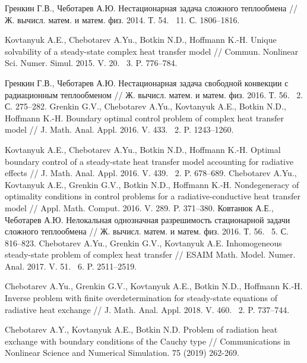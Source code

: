 \documentclass[12pt]{article}
\begin{document}
\begin{thebibliography}{999}
        Гренкин Г.В., Чеботарев А.Ю. Нестационарная задача сложного теплообмена // Ж. вычисл. матем. и матем. физ. 2014. Т. 54. \textnumero~11. С. 1806--1816.

        Kovtanyuk A.E., Chebotarev A.Yu., Botkin N.D., Hoffmann K.-H. Unique solvability of a steady-state complex heat transfer model // Commun. Nonlinear Sci. Numer. Simul. 2015. V. 20. \textnumero~3. P. 776--784.

        Гренкин Г.В., Чеботарев А.Ю. Нестационарная задача свободной конвекции с радиационным теплообменом // Ж. вычисл. матем. и матем. физ. 2016. Т. 56. \textnumero~2. С. 275--282.
        Grenkin G.V., Chebotarev A.Yu., Kovtanyuk A.E., Botkin N.D., Hoffmann K.-H. Boundary optimal control problem of complex heat transfer model // J. Math. Anal. Appl. 2016. V. 433. \textnumero~2. P. 1243--1260.

        Kovtanyuk A.E., Chebotarev A.Yu., Botkin N.D., Hoffmann K.-H. Optimal boundary control of a steady-state heat transfer model accounting for radiative effects // J. Math. Anal. Appl. 2016. V. 439. \textnumero~2. P. 678--689.
        Chebotarev A.Yu., Kovtanyuk A.E., Grenkin G.V., Botkin N.D., Hoffmann K.-H.
        Nondegeneracy of optimality conditions in control problems for a radiative-conductive heat transfer model // Appl. Math. Comput. 2016. V. 289. P. 371--380.
        Ковтанюк А.Е., Чеботарев А.Ю. Нелокальная однозначная разрешимость стационарной задачи сложного теплообмена // Ж. вычисл. матем. и матем. физ. 2016. Т. 56. \textnumero~5. С. 816--823.
        Chebotarev A.Yu., Grenkin G.V., Kovtanyuk A.E. Inhomogeneous steady-state problem of complex heat transfer // ESAIM Math. Model. Numer. Anal. 2017. V. 51. \textnumero~6. P. 2511--2519.

        Chebotarev A.Yu., Grenkin G.V., Kovtanyuk A.E., Botkin N.D., Hoffmann K.-H. Inverse problem with finite overdetermination for steady-state equations of radiative heat exchange // J. Math. Anal. Appl. 2018. V. 460. \textnumero~2. P. 737--744.

        Chebotarev A.Y., Kovtanyuk A.E., Botkin N.D. Problem of radiation heat exchange with boundary conditions of the Cauchy type // Communications in Nonlinear Science and Numerical Simulation. 75 (2019) 262-269.


\end{thebibliography}
\end{document}
